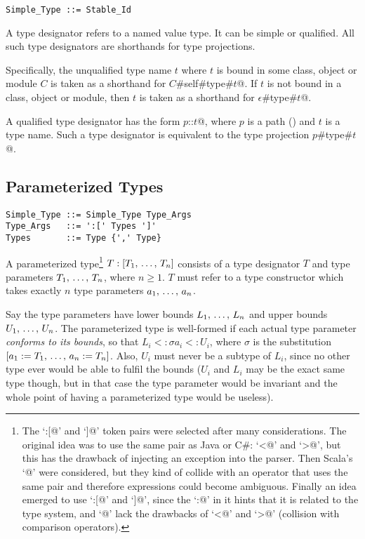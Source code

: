 \syntax\begin{lstlisting}
Simple_Type ::= Stable_Id
\end{lstlisting}

A type designator refers to a named value type. It can be simple or qualified. All such type designators are shorthands for type projections. 

Specifically, the unqualified type name $t$ where $t$ is bound in some class, object or module $C$ is taken as a shorthand for \lstinline@$C$#self#type#$t$@. If $t$ is not bound in a class, object or module, then $t$ is taken as a shorthand for \lstinline@$\epsilon$#type#$t$@. 

A qualified type designator has the form \lstinline@$p$::$t$@, where $p$ is a path () and $t$ is a type name. Such a type designator is equivalent to the type projection \lstinline@$p$#type#$t$@. 

\subsection{Parameterized Types}
\label{sec:parameterized-types}

\syntax\begin{lstlisting}
Simple_Type ::= Simple_Type Type_Args
Type_Args   ::= ':[' Types ']'
Types       ::= Type {',' Type}
\end{lstlisting}

A parameterized type\footnote{The `\lstinline@:[@' and `\lstinline@]@' token pairs were selected after many considerations. The original idea was to use the same pair as Java or C\#: `\lstinline@<@' and `\lstinline@>@', but this has the drawback of injecting an exception into the parser. Then Scala's `@' were considered, but they kind of collide with an operator that uses the same pair and therefore expressions could become ambiguous. Finally an idea emerged to use `\lstinline@:[@' and `\lstinline@]@', since the `\lstinline@:@' in it hints that it is related to the type system, and `@' lack the drawbacks of `\lstinline@<@' and `\lstinline@>@' (collision with comparison operators).} $T:[T_1 ,\, \ldots ,\, T_n]$ consists of a type designator $T$ and type parameters $T_1 ,\, \ldots ,\, T_n$, where $n \geq 1$. $T$ must refer to a type constructor which takes exactly $n$ type parameters $a_1 ,\, \ldots ,\, a_n$. 

Say the type parameters have lower bounds $L_1 ,\, \ldots ,\, L_n$ and upper bounds $U_1 ,\, \ldots ,\, U_n$. The parameterized type is well-formed if each actual type parameter {\em conforms to its bounds}, so that $L_i <: \sigma a_i <: U_i$, where $\sigma$ is the substitution $[a_1 := T_1 ,\, \ldots ,\, a_n := T_n]$. Also, $U_i$ must never be a subtype of $L_i$, since no other type ever would be able to fulfil the bounds ($U_i$ and $L_i$ may be the exact same type though, but in that case the type parameter would be invariant and the whole point of having a parameterized type would be useless). 


